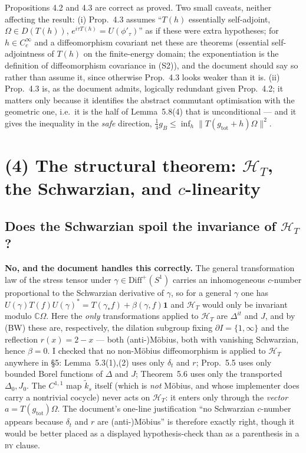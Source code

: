 \documentclass[11pt]{article}
\newcommand{\HT}{\mathcal H_T}
\newcommand{\kt}{\widetilde k}
\newcommand{\norm}[1]{\lVert#1\rVert}
\newcommand{\gB}{g_B}
\newcommand{\one}{\mathbf 1}
\newcommand{\Om}{\Omega}
\newcommand{\gtot}{g_{\mathrm{tot}}}
\begin{document}
\begin{verdictok}
Propositions 4.2 and 4.3 are correct as proved.  Two small caveats, neither affecting the result:
(i) Prop.~4.3 assumes ``$T(h)$ essentially self-adjoint, $\Om\in D(T(h))$, $e^{i\tau T(h)}=U(\phi'_\tau)$''
as if these were extra hypotheses; for $h\in C^\infty_c$ and a diffeomorphism covariant net these are
theorems (essential self-adjointness of $T(h)$ on the finite-energy domain; the exponentiation is the
definition of diffeomorphism covariance in (S2)), and the document should say so rather than assume it,
since otherwise Prop.~4.3 looks weaker than it is.
(ii) Prop.~4.3 is, as the document admits, logically redundant given Prop.~4.2; it matters only because it
identifies the abstract commutant optimisation with the geometric one, i.e.\ it is the half of
Lemma~5.8(4) that is unconditional --- and it gives the inequality in the \emph{safe} direction,
$\frac14\gB\le\inf_h\norm{T(\gtot+h)\Om}^2$.
\end{verdictok}

\section{(4) The structural theorem: $\HT$, the Schwarzian, and $c$-linearity}\label{r:struct}

\subsection{Does the Schwarzian spoil the invariance of $\HT$?}

\begin{verdictok}
\textbf{No, and the document handles this correctly.}  The general transformation law of the stress tensor
under $\gamma\in\mathrm{Diff}^+(S^1)$ carries an inhomogeneous $c$-number proportional to the Schwarzian
derivative of $\gamma$, so for a general $\gamma$ one has
$U(\gamma)T(f)U(\gamma)^*=T(\gamma_*f)+\beta(\gamma,f)\one$ and $\HT$ would only be invariant modulo
$\mathbb C\Om$.  Here the \emph{only} transformations applied to $\HT$ are $\Delta^{it}$ and $J$, and by
(BW) these are, respectively, the dilation subgroup fixing $\partial I=\{1,\infty\}$ and the reflection
$r(x)=2-x$ --- both (anti-)M\"obius, both with vanishing Schwarzian, hence $\beta=0$.
I checked that no non-M\"obius diffeomorphism is applied to $\HT$ anywhere in \S5: Lemma~5.3(1),(2) uses only
$\delta_t$ and $r$; Prop.~5.5 uses only bounded Borel functions of $\Delta$ and $J$; Theorem~5.6 uses only
the transported $\Delta_0,J_0$.  The $C^{1,1}$ map $\kt_s$ itself (which is \emph{not} M\"obius, and whose
implementer does carry a nontrivial cocycle) never acts on $\HT$: it enters only through the \emph{vector}
$a=T(\gtot)\Om$.  The document's one-line justification ``no Schwarzian $c$-number appears because
$\delta_t$ and $r$ are (anti-)M\"obius'' is therefore exactly right, though it would be better placed as a
displayed hypothesis-check than as a parenthesis in a \textsc{by} clause.
\end{verdictok}
\end{document}
